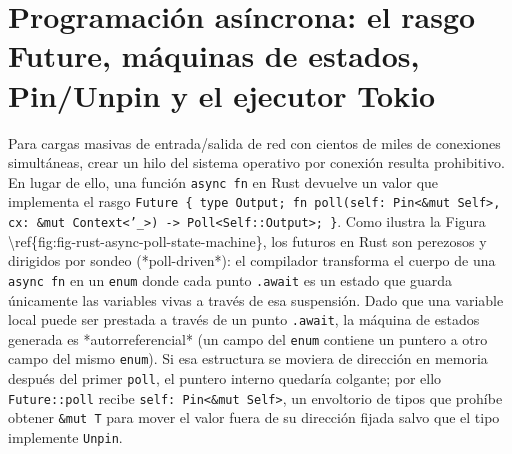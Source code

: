 \documentclass{book}
\begin{document}
\section{Programación asíncrona: el rasgo Future, máquinas de estados, Pin/Unpin y el ejecutor Tokio}

Para cargas masivas de entrada/salida de red con cientos de miles de conexiones simultáneas, crear un hilo del sistema operativo por conexión resulta prohibitivo. En lugar de ello, una función \texttt{async fn} en Rust devuelve un valor que implementa el rasgo \texttt{Future \{ type Output; fn poll(self: Pin<\&mut Self>, cx: \&mut Context<'\_>) -> Poll<Self::Output>; \}}. Como ilustra la Figura \textbackslash{}ref\{fig:fig-rust-async-poll-state-machine\}, los futuros en Rust son perezosos y dirigidos por sondeo (*poll-driven*): el compilador transforma el cuerpo de una \texttt{async fn} en un \texttt{enum} donde cada punto \texttt{.await} es un estado que guarda únicamente las variables vivas a través de esa suspensión. Dado que una variable local puede ser prestada a través de un punto \texttt{.await}, la máquina de estados generada es *autorreferencial* (un campo del \texttt{enum} contiene un puntero a otro campo del mismo \texttt{enum}). Si esa estructura se moviera de dirección en memoria después del primer \texttt{poll}, el puntero interno quedaría colgante; por ello \texttt{Future::poll} recibe \texttt{self: Pin<\&mut Self>}, un envoltorio de tipos que prohíbe obtener \texttt{\&mut T} para mover el valor fuera de su dirección fijada salvo que el tipo implemente \texttt{Unpin}.
\end{document}
